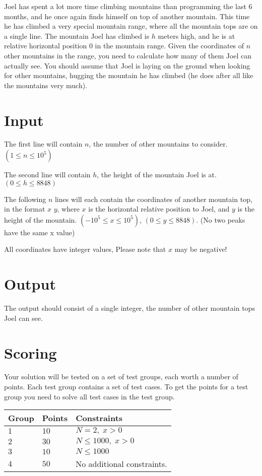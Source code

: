 \noindent

Joel has spent a lot more time climbing mountains than programming the last 6 months, and he once again finds himself on top of another mountain.
This time he has climbed a very special mountain range, where all the mountain tops are on a single line. 
The mountain Joel has climbed is $h$ meters high, and he is at relative horizontal position 0 in the mountain range.
Given the coordinates of $n$ other mountains in the range, you need to calculate how many of them Joel can actually see.
You should assume that Joel is laying on the ground when looking for other mountains, hugging the mountain he has climbed (he does after all like the mountains very much).

\section*{Input}
The first line will contain $n$, the number of other mountains to consider. $(1 \leq n \leq 10^{5})$

The second line will contain $h$, the height of the mountain Joel is at. $(0 \leq h \leq 8848)$

The following $n$ lines will each contain the coordinates of another mountain top, in the format $x$ $y$, where $x$ is the horizontal relative position to Joel,
and $y$ is the height of the mountain. $(-10^{5} \leq x \leq 10^{5})$, $(0 \leq y \leq 8848)$. (No two peaks have the same x value)

All coordinates have integer values, Please note that $x$ may be negative!

\section*{Output}
The output should consist of a single integer, the number of other mountain tops Joel can see.

\section*{Scoring}
Your solution will be tested on a set of test groups, each worth a number of points. Each test group contains
a set of test cases. To get the points for a test group you need to solve all test cases in the test group.

\noindent
\begin{tabular}{| l | l | p{12cm} |}
  \hline
  \textbf{Group} & \textbf{Points} & \textbf{Constraints} \\ \hline
  $1$    & $10$       & $N = 2,\;x > 0$ \\ \hline
  $2$    & $30$       & $N \leq 1000,\;x > 0$ \\ \hline
  $3$    & $10$       & $N \leq 1000$ \\ \hline
  $4$    & $50$       & No additional constraints. \\ \hline
\end{tabular}

